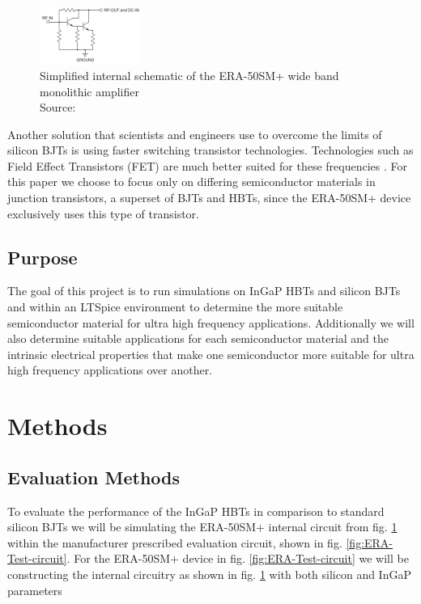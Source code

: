 \documentclass[conference]{IEEEtran}
\begin{document}
\begin{figure}[htbp]
    \centerline{\includegraphics[width=0.3\textwidth]{figures/era50sm-schematic.png}}
    \caption{Simplified internal schematic of the ERA-50SM+ wide band monolithic amplifier \\ Source: \cite{ERA-50SM+}}
    \label{fig:ERA-50SM}
\end{figure}

Another solution that scientists and engineers use to overcome the limits of silicon BJTs is using faster switching transistor
technologies. Technologies such as  Field Effect Transistors (FET) are much better suited for these frequencies \cite{Schwierz2007}.
For this paper we choose to focus only on differing semiconductor materials in junction transistors, a superset of BJTs and HBTs,
since the ERA-50SM+ device exclusively uses this type of transistor.

\subsection{Purpose}

The goal of this project is to run simulations on InGaP HBTs and silicon BJTs and within an LTSpice environment to determine the more
suitable semiconductor material for ultra high frequency applications. Additionally we will also determine suitable applications for
each semiconductor material and the intrinsic electrical properties that make one semiconductor more suitable for ultra high frequency
applications over another.

\section{Methods}

\subsection{Evaluation Methods}

To evaluate the performance of the InGaP HBTs in comparison to standard silicon BJTs we will be simulating the ERA-50SM+ internal
circuit from fig. \ref{fig:ERA-50SM} within the manufacturer prescribed evaluation circuit, shown in fig. \ref{fig:ERA-Test-circuit}.
For the ERA-50SM+ device in fig. \ref{fig:ERA-Test-circuit} we will be constructing the internal circuitry as shown in fig. \ref{fig:ERA-50SM}
with both silicon and InGaP parameters
\end{document}
